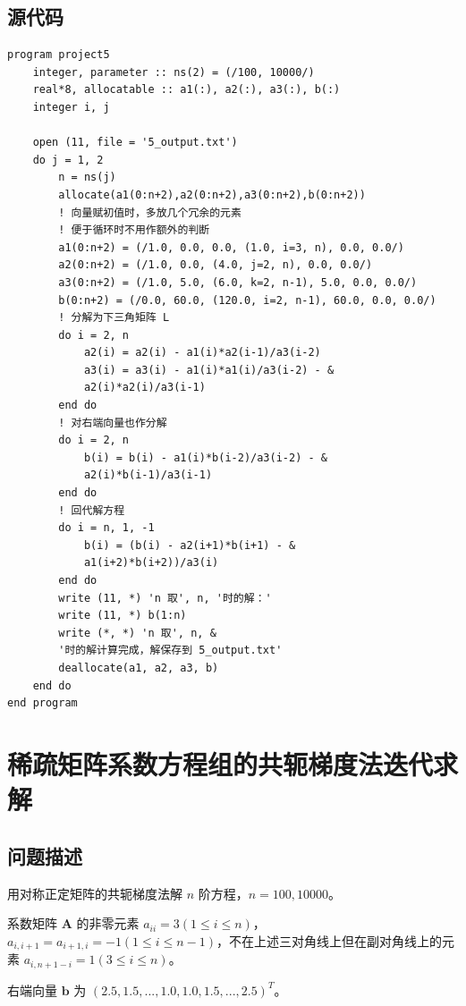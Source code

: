 \documentclass{ctexart}
\begin{document}
\subsection{源代码}
\begin{lstlisting}
program project5
	integer, parameter :: ns(2) = (/100, 10000/)
	real*8, allocatable :: a1(:), a2(:), a3(:), b(:)
	integer i, j

	open (11, file = '5_output.txt')
	do j = 1, 2
		n = ns(j)
		allocate(a1(0:n+2),a2(0:n+2),a3(0:n+2),b(0:n+2))
		! 向量赋初值时，多放几个冗余的元素
		! 便于循环时不用作额外的判断
		a1(0:n+2) = (/1.0, 0.0, 0.0, (1.0, i=3, n), 0.0, 0.0/)
		a2(0:n+2) = (/1.0, 0.0, (4.0, j=2, n), 0.0, 0.0/)
		a3(0:n+2) = (/1.0, 5.0, (6.0, k=2, n-1), 5.0, 0.0, 0.0/)
		b(0:n+2) = (/0.0, 60.0, (120.0, i=2, n-1), 60.0, 0.0, 0.0/)
		! 分解为下三角矩阵 L
		do i = 2, n
			a2(i) = a2(i) - a1(i)*a2(i-1)/a3(i-2)
			a3(i) = a3(i) - a1(i)*a1(i)/a3(i-2) - &
			a2(i)*a2(i)/a3(i-1)
		end do
		! 对右端向量也作分解
		do i = 2, n
			b(i) = b(i) - a1(i)*b(i-2)/a3(i-2) - &
			a2(i)*b(i-1)/a3(i-1)
		end do
		! 回代解方程
		do i = n, 1, -1
			b(i) = (b(i) - a2(i+1)*b(i+1) - &
			a1(i+2)*b(i+2))/a3(i)
		end do
		write (11, *) 'n 取', n, '时的解：'
		write (11, *) b(1:n)
		write (*, *) 'n 取', n, &
		'时的解计算完成，解保存到 5_output.txt'
		deallocate(a1, a2, a3, b)
	end do
end program
\end{lstlisting}
\newpage
\section{稀疏矩阵系数方程组的共轭梯度法迭代求解}
\subsection{问题描述}
用对称正定矩阵的共轭梯度法解 $n$ 阶方程，$n = 100, 10000$。

系数矩阵 $\mathbf A$ 的非零元素 $a_{ii}=3(1\le i\le n)$，$a_{i,i+1}=a_{i+1,i}=-1(1\le i\le n-1)$，不在上述三对角线上但在副对角线上的元素 $a_{i,n+1-i}=1(3\le i\le n)$。

右端向量 $\mathbf b$ 为 $(2.5, 1.5, ..., 1.0, 1.0, 1.5, ..., 2.5)^T$。
\end{document}
